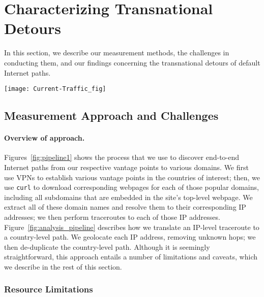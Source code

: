 \section{Characterizing Transnational Detours}
\label{datasets}
In this section, we describe our measurement methods, the challenges in
conducting them, and our findings concerning the transnational detours
of default Internet paths.

\begin{figure*}[t]
\centering
\texttt{[image: Current-Traffic\_fig]}
\caption{Measurement pipeline to study Internet paths from countries to
  popular domains.}
\label{fig:pipeline1}
\end{figure*}


\subsection{Measurement Approach and Challenges}
\label{pipeline}

\paragraph{Overview of approach.}
Figures~\ref{fig:pipeline1} shows the process that we use to discover end-to-end
Internet paths from our respective vantage points to various domains. We first use
VPNs
to establish various vantage points in the countries of interest; then, we use 
{\tt curl} to download corresponding webpages for each of those popular domains,
including all subdomains that are embedded in the site's top-level webpage. We extract
all of these domain names and resolve them to their corresponding IP addresses;
we then perform traceroutes to each of those IP addresses.
Figure~\ref{fig:analysis_pipeline} describes how we translate an IP-level traceroute
to a country-level path. We geolocate each IP address, removing unknown hops; we
then de-duplicate the country-level path. Although it is seemingly straightforward,
this approach entails a number of limitations and caveats, which we describe in
the
rest of this section.

\subsubsection{Resource Limitations}
\label{resource_limits}

